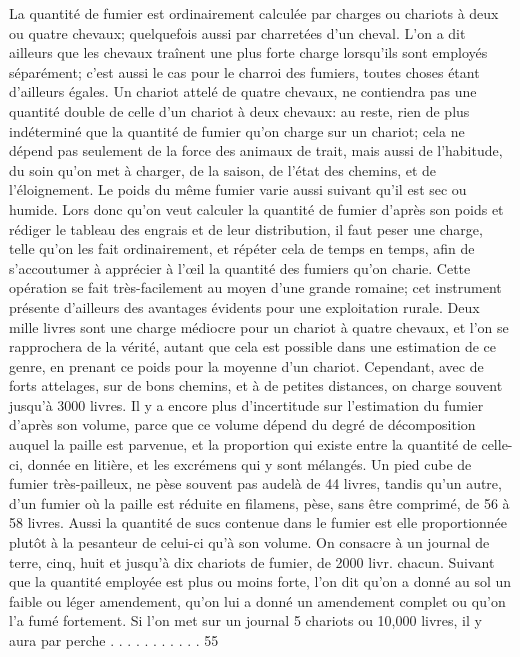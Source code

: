La quantité de fumier est ordinairement calculée par charges ou chariots à deux ou quatre chevaux; quelquefois aussi par charretées d'un cheval. L'on a dit ailleurs que les chevaux traînent une plus forte charge lorsqu'ils sont employés séparément; c'est aussi le cas pour le charroi des fumiers, toutes choses étant d'ailleurs égales. Un chariot attelé de quatre chevaux, ne contiendra pas une quantité double de celle d'un chariot à deux chevaux: au reste, rien de plus indéterminé que la quantité de fumier qu'on charge sur un chariot; cela ne dépend pas seulement de la force des animaux de trait, mais aussi de l'habitude, du soin qu'on met à charger, de la saison, de l'état des chemins,\setcounter{page}{48} et de l'éloignement. Le poids du même fumier varie aussi suivant qu'il est sec ou humide. Lors donc qu'on veut calculer la quantité de fumier d'après son poids et rédiger le tableau des engrais et de leur distribution, il faut peser une charge, telle qu'on les fait ordinairement, et répéter cela de temps en temps, afin de s'accoutumer à apprécier à l'œil la quantité des fumiers qu'on charie. Cette opération se fait très-facilement au moyen d'une grande romaine; cet instrument présente d'ailleurs des avantages évidents pour une exploitation rurale. Deux mille livres sont une charge médiocre pour un chariot à quatre chevaux, et l'on se rapprochera de la vérité, autant que cela est possible dans une estimation de ce genre, en prenant ce poids pour la moyenne d'un chariot. Cependant, avec de forts attelages, sur de bons chemins, et à de petites distances, on charge souvent jusqu'à 3000 livres. Il y a encore plus d'incertitude sur l'estimation du fumier d'après son volume, parce que ce volume dépend du degré de décomposition auquel la paille est parvenue, et la proportion qui existe entre la quantité de celle-ci, donnée en litière, et les excrémens qui y sont mélangés. Un pied cube de fumier très-pailleux, ne pèse souvent pas audelà\setcounter{page}{49} de 44 livres, tandis qu'un autre, d'un fumier où la paille est réduite en filamens, pèse, sans être comprimé, de 56 à 58 livres. Aussi la quantité de sucs contenue dans le fumier est elle proportionnée plutôt à la pesanteur de celui-ci qu'à son volume.
On consacre à un journal de terre, cinq, huit et jusqu'à dix chariots de fumier, de 2000 livr. chacun. Suivant que la quantité employée est plus ou moins forte, l'on dit qu'on a donné au sol un faible ou léger amendement, qu'on lui a donné un amendement complet ou qu'on l'a fumé fortement.
Si l'on met sur un journal 5 chariots ou 10,000 livres, il y aura par perche . . . . . . . . . . . 55
